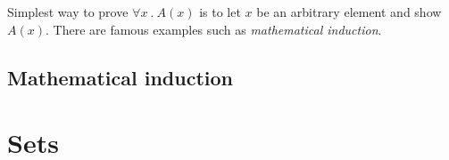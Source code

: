 \documentclass[10pt,a4paper]{article}
\begin{document}
Simplest way to prove $\forall x\:.\:A(x)$ is to let $x$ be an arbitrary element and show $A(x)$.
There are famous examples such as \textit{mathematical induction}.

\subsection{Mathematical induction}


\section{Sets}



\end{document}
